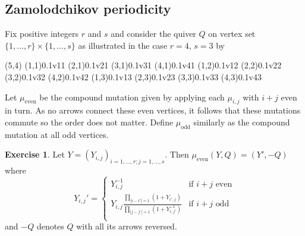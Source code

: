 \documentclass{amsart}
\theoremstyle{definition}
\newtheorem{exercise}[theorem]{Exercise}
\theoremstyle{remark}
\numberwithin{equation}{section}
\begin{document}
\subsection{Zamolodchikov periodicity}
	Fix positive integers $r$ and $s$ and consider the quiver $Q$ on vertex set $\{1,\ldots, r \} \times \{1,\ldots, s\}$ as illustrated in the case $r=4$, $s=3$ by
	
	\begin{pspicture}(5,4)
		\cnode(1,1){0.1}{v11}
		\cnode(2,1){0.1}{v21}
		\cnode(3,1){0.1}{v31}
		\cnode(4,1){0.1}{v41}
		\cnode(1,2){0.1}{v12}
		\cnode(2,2){0.1}{v22}
		\cnode(3,2){0.1}{v32}
		\cnode(4,2){0.1}{v42}
		\cnode(1,3){0.1}{v13}
		\cnode(2,3){0.1}{v23}
		\cnode(3,3){0.1}{v33}
		\cnode(4,3){0.1}{v43}
	\end{pspicture}
	
	Let $\mu_{\textrm{even}}$ be the compound mutation given by applying each $\mu_{i,j}$ with $i+j$ even in turn.  As no arrows connect these even vertices, it follows that these mutations commute so the order does not matter.  Define $\mu_{\textrm{odd}}$ similarly as the compound mutation at all odd vertices.
	
	\begin{exercise}
		Let $Y = (Y_{i,j})_{i=1,\ldots, r; j=1,\ldots, s}$.  Then $\mu_{\textrm{even}}(Y,Q) = (Y',-Q)$ where
		\begin{equation} \label{eq:YSystemCases}
			Y_{i,j}' = \begin{cases}
			Y_{i,j}^{-1} & \textrm{if $i+j$ even} \\
			Y_{i,j}\frac{\displaystyle\prod_{|i-i'|=1}(1+Y_{i',j})}{\displaystyle\prod_{|j-j'|=1}(1+Y_{i,j'}^{-1})} & \textrm{if $i+j$ odd} \\
			\end{cases}
		\end{equation}
		and $-Q$ denotes $Q$ with all its arrows reversed.
	\end{exercise}
	
\end{document}
